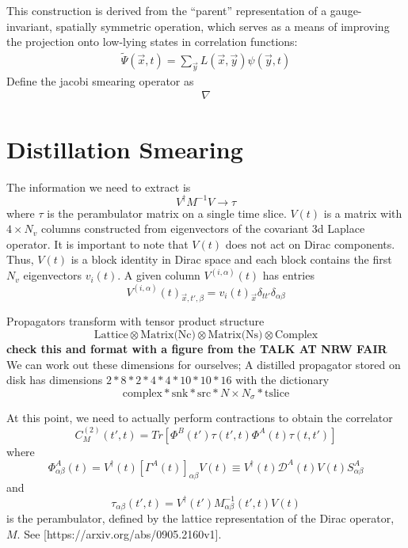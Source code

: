 This construction is derived from the ``parent'' representation of a gauge-invariant, spatially symmetric operation, which serves as a means of improving the projection onto low-lying states in correlation functions:
\begin{align}
    \tilde{\Psi}(\vec{x},t) = \sum_{\vec{y}} L(\vec{x},\vec{y})\psi(\vec{y},t)
\end{align}
Define the jacobi smearing operator as 
\begin{align}
\nabla
\end{align}

\section{Distillation Smearing}
The information we need to extract is 
$$ V^{\dagger}M^{-1}V \rightarrow \tau $$ 
where $\tau$ is the perambulator matrix on a single time slice. 
$V(t)$ is a matrix with $4 \times N_v $  columns constructed from eigenvectors of the covariant 3d Laplace operator. It is important to note that $V(t)$ does not act on Dirac components. Thus, $V(t)$ is a block identity in Dirac space and each block contains the first $N_v$ eigenvectors $v_i(t)$. A given column $V^{(i,\alpha)}(t)$ has entries 
$$ V^{(i,\alpha)}(t)_{\vec{x},t',\beta} = v_i(t)_{\vec{x}} \delta_{tt'}\delta_{\alpha\beta}$$


Propagators transform with tensor product structure 
$$\text{Lattice} \otimes \text{Matrix(Nc)} \otimes \text{Matrix(Ns)} \otimes \text{Complex}$$
\textbf{check this and format with a figure from the TALK AT NRW FAIR }
We can work out these dimensions for ourselves; A distilled propagator stored on disk has dimensions 
$ 2 * 8 *2 *4 *4 *10 * 10 * 16$ 
with the dictionary 
$$\text{} \text{complex} * \text{snk} * \text{src} * N \times N_{\sigma} * \text{tslice}$$

At this point, we need to actually perform contractions to obtain the correlator 
$$C_M^{(2)}(t',t) = Tr[\Phi^B(t')\tau(t',t)\Phi^A(t)\tau(t,t')]$$ 
where 
$$\Phi^A_{\alpha\beta}(t) = V^{\dagger}(t) [\Gamma^A(t)]_{\alpha\beta} V(t) \equiv V^{\dagger}(t)\mathcal{D}^A(t)V(t)S^A_{\alpha\beta}$$ 
and 
$$\tau_{\alpha\beta}(t',t) = V^{\dagger}(t')M_{\alpha\beta}^{-1}(t',t)V(t)$$ 
is the perambulator, defined by the lattice representation of the Dirac operator, $M$. 
See [https://arxiv.org/abs/0905.2160v1]. 